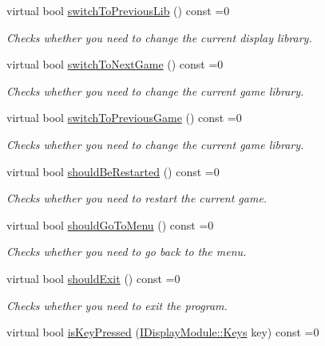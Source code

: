 \begin{DoxyCompactItemize}
virtual bool \mbox{\hyperlink{classArcade_1_1Display_1_1IDisplayModule_a498d51597164e9f92e97ec2afee426b0}{switch\+To\+Previous\+Lib}} () const =0
\begin{DoxyCompactList}\small\item\em Checks whether you need to change the current display library. \end{DoxyCompactList}\item 
virtual bool \mbox{\hyperlink{classArcade_1_1Display_1_1IDisplayModule_a9584cb0ca3b157c9a4ec94509e4f8e32}{switch\+To\+Next\+Game}} () const =0
\begin{DoxyCompactList}\small\item\em Checks whether you need to change the current game library. \end{DoxyCompactList}\item 
virtual bool \mbox{\hyperlink{classArcade_1_1Display_1_1IDisplayModule_a3bbbfe00907c8f3e4c7ef1aadedcc513}{switch\+To\+Previous\+Game}} () const =0
\begin{DoxyCompactList}\small\item\em Checks whether you need to change the current game library. \end{DoxyCompactList}\item 
virtual bool \mbox{\hyperlink{classArcade_1_1Display_1_1IDisplayModule_adc5d499229aa5899bbd4bae14f00cb27}{should\+Be\+Restarted}} () const =0
\begin{DoxyCompactList}\small\item\em Checks whether you need to restart the current game. \end{DoxyCompactList}\item 
virtual bool \mbox{\hyperlink{classArcade_1_1Display_1_1IDisplayModule_ad060f6b99f2adffaf02a4226fc40d0ab}{should\+Go\+To\+Menu}} () const =0
\begin{DoxyCompactList}\small\item\em Checks whether you need to go back to the menu. \end{DoxyCompactList}\item 
virtual bool \mbox{\hyperlink{classArcade_1_1Display_1_1IDisplayModule_a550877fb92d58325404b9ebe9e71f6ff}{should\+Exit}} () const =0
\begin{DoxyCompactList}\small\item\em Checks whether you need to exit the program. \end{DoxyCompactList}\item 
virtual bool \mbox{\hyperlink{classArcade_1_1Display_1_1IDisplayModule_af871661ff84c21581cd7233ba6f27aa0}{is\+Key\+Pressed}} (\mbox{\hyperlink{classArcade_1_1Display_1_1IDisplayModule_a8da3f6b309ca0581473ae8cc8789b619}{I\+Display\+Module\+::\+Keys}} key) const =0

\end{DoxyCompactItemize}

